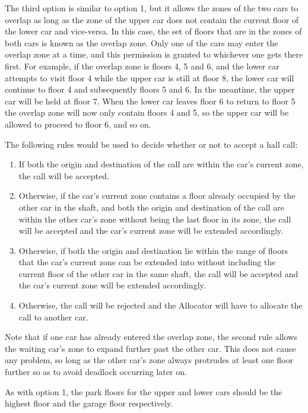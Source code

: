 \documentclass{UoYCSproject}
\begin{document}
The third option is similar to option 1, but it allows the zones of the two cars to overlap as long as the zone of the upper car does not contain the current floor of the lower car and vice-versa.  In this case, the set of floors that are in the zones of both cars is known as the overlap zone.  Only one of the cars may enter the overlap zone at a time, and this permission is granted to whichever one gets there first.  For example, if the overlap zone is floors 4, 5 and 6, and the lower car attempts to visit floor 4 while the upper car is still at floor 8, the lower car will continue to floor 4 and subsequently floors 5 and 6.  In the meantime, the upper car will be held at floor 7.  When the lower car leaves floor 6 to return to floor 5 the overlap zone will now only contain floors 4 and 5, so the upper car will be allowed to proceed to floor 6, and so on.

The following rules would be used to decide whether or not to accept a hall call:
\begin{enumerate}
	\item If both the origin and destination of the call are within the car's current zone, the call will be accepted.
	\item Otherwise, if the car's current zone contains a floor already occupied by the other car in the shaft, and both the origin and destination of the call are within the other car's zone without being the last floor in its zone, the call will be accepted and the car's current zone will be extended accordingly.
	\item Otherwise, if both the origin and destination lie within the range of floors that the car's current zone can be extended into without including the current floor of the other car in the same shaft, the call will be accepted and the car's current zone will be extended accordingly.
	\item Otherwise, the call will be rejected and the Allocator will have to allocate the call to another car.
\end{enumerate}

Note that if one car has already entered the overlap zone, the second rule allows the waiting car's zone to expand further past the other car.  This does not cause any problem, so long as the other car's zone always protrudes at least one floor further so as to avoid deadlock occurring later on.

As with option 1, the park floors for the upper and lower cars should be the highest floor and the garage floor respectively.
\end{document}
